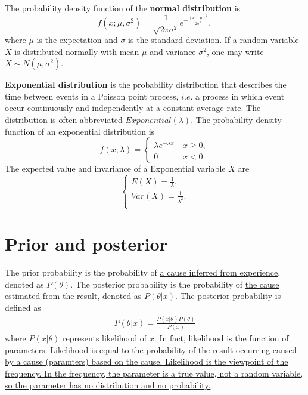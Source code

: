 \documentclass[10pt,onecolumn]{book}
\begin{document}
The probability density function of the \textbf{normal distribution} is
\begin{equation}
f(x; \mu, \sigma^2) = \frac{1}{\sqrt{2 \pi \sigma^2}} e^{-\frac{(x - \mu)^2}{2\sigma^2}},
\end{equation}
where $\mu$ is the expectation and $\sigma$ is the standard deviation. If a random variable $X$ is distributed normally with mean $\mu$ and variance $\sigma^2$, one may write $X \sim N(\mu, \sigma^2)$. 

\textbf{Exponential distribution} is the probability distribution that describes the time between events in a Poisson point process, $i.e.$ a process in which event occur continuously and independently at a constant average rate. The distribution is often abbreviated $Exponential(\lambda)$. The probability density function of an exponential distribution is 
\begin{equation}
f(x;\lambda)=
\left\{
	\begin{array}{ll}
		\lambda e ^ {- \lambda x} \ & x \ge 0, \\
		0						    & x < 0.
	\end{array}
\right.
\end{equation}
The expected value and invariance of a Exponential variable $X$ are
\begin{equation}
\left\{
	\begin{array}{lr}
	E(X) = \frac{1}{\lambda}, \\
	Var(X) = \frac{1}{\lambda ^ 2}. \\	
	\end{array}
\right.
\end{equation}

\section{Prior and posterior}
The prior probability is the probability of \uline{a cause inferred from experience}, denoted as $P(\theta)$. The posterior probability is the probability of \uline{the cause estimated from the result}, denoted as $P(\theta|x)$. The posterior probability is defined as 
\begin{equation}\label{eq:posterior}
\begin{split}
P(\theta|x) = \frac{P(x|\theta) P(\theta)}{P(x)}
\end{split}
\end{equation}
where $P(x|\theta)$ represents likelihood of $x$. \uline{In fact, likelihood is the function of parameters. Likelihood is equal to the probability of the result occurring caused by a cause (paramters) based on the cause. Likelihood is the viewpoint of the frequency. In the frequency, the parameter is a true value, not a random variable, so the parameter has no distribution and no probability.}
\end{document}
